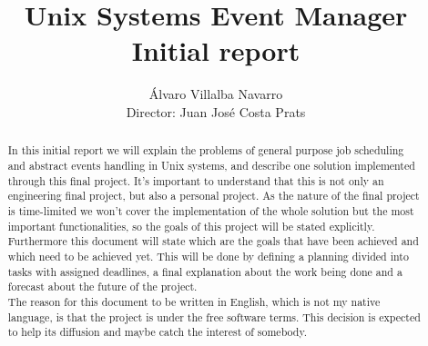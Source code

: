 \documentclass[a4paper,11pt]{article}
\title{Unix Systems Event Manager \\ Initial report}
\author{Álvaro Villalba Navarro \\ Director: Juan José Costa Prats}
\begin{document}
\maketitle

\begin{abstract}
In this initial report we will explain the problems of general purpose job scheduling and
abstract events handling in Unix systems, and describe one solution implemented through this final project.
It's important to understand that this is not 
only an engineering final project, but also a personal project. As the nature of the final 
project is time-limited we won't cover the implementation of the whole solution but the most important 
functionalities, so the goals of this project will be stated explicitly.\\
Furthermore this document will state which are the goals that have been achieved and which need to be 
achieved yet. This will be done by defining a planning divided into tasks with assigned deadlines, a
final explanation about the work being done and a forecast about the future of the project.\\
The reason for this document to be written in English, which is not my native language, is that the project 
is under the free software terms. This decision is expected to help its diffusion and maybe catch the interest
of somebody.\\
\end{abstract}
\end{document}
